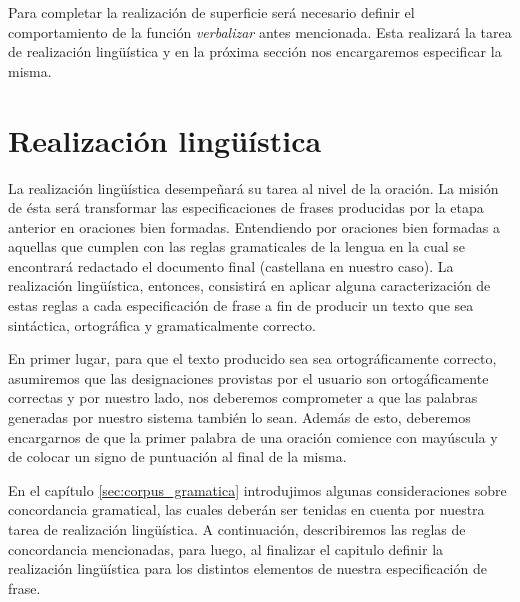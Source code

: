 Para completar la realización de superficie será necesario definir el comportamiento de la función \emph{verbalizar} antes mencionada. Esta realizará la tarea de realización lingüística y en la próxima sección nos encargaremos especificar la misma.





\section{Realización lingüística}
\label{cap:linguistic_realization}

La realización lingüística desempeñará su tarea al nivel de la oración. La misión de ésta será transformar las especificaciones de frases producidas por la etapa anterior en oraciones bien formadas. Entendiendo por oraciones bien formadas a aquellas que cumplen con las reglas gramaticales de la lengua en la cual se encontrará redactado el documento final (castellana en nuestro caso). La realización lingüística, entonces, consistirá en aplicar alguna caracterización de estas reglas a cada especificación de frase a fin de producir un texto que sea sintáctica, ortográfica y gramaticalmente correcto.

En primer lugar, para que el texto producido sea sea ortográficamente correcto, asumiremos que las designaciones provistas por el usuario son ortogáficamente correctas y por nuestro lado, nos deberemos comprometer a que las palabras generadas por nuestro sistema también lo sean. Además de esto, deberemos encargarnos de que la primer palabra de una oración comience con mayúscula y de colocar un signo de puntuación al final de la misma.

En el capítulo \ref{sec:corpus_gramatica} introdujimos algunas consideraciones sobre concordancia gramatical, las cuales deberán ser tenidas en cuenta por nuestra tarea de realización lingüística. A continuación, describiremos las reglas de concordancia mencionadas, para luego, al finalizar el capitulo definir la realización lingüística para los distintos elementos de nuestra especificación de frase.

